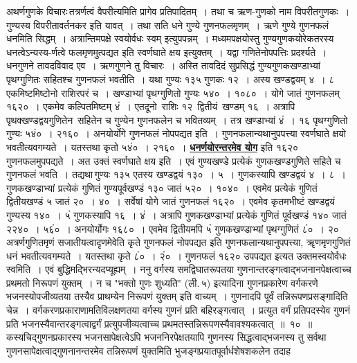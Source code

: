 \documentclass[11pt, openany]{book}
\begin{document}
\vspace{-4mm}
 अथर्णगुणके विचारः\textendash \,तत्रर्णत्वं वैपरीत्यमिति प्रागेव प्रतिपादितम्~।
तथा च ऋण-गुणको नाम विपरीतगुणकः~। गुण्यस्य विपरीतावर्तनकर इति
यावत्~। तथा सति धने गुण्ये गुणनफलमृणम्~। ऋणे गुण्ये गुणनफलं
धनमिति सिद्धम्~। अत्रान्तिमपक्षे स्वयोर्वधः स्वम् इत्युपपन्नम्~।
मध्यमपक्षयोस्तु गुण्यगुणकयोरेकतरस्य धनत्वेऽन्यस्य-र्णत्वे फलमृणमुत्पद्यत इति स्वर्णघाते
क्षय इत्युक्तम्~। यद्वा गणितेनोपपत्तिः प्रदर्श्यते~। धनगुणने तावदविवाद एव~।
ऋणगुणने तु विचारः~। अस्ति तावदिदं सुप्रसिद्धं गुण्यगुणकखण्डाभ्यां
पृथग्गुणितः सहितश्च गुणनफलं भवतीति~। यथा गुण्यः १३५ गुणकः १२~।
अस्य खण्डद्वयम् ४~। ८ एकमिष्टमिष्टोनो राशिरपरं च~। खण्डाभ्यां
पृथग्गुणितो गुण्यः ५४०~। १०८०~। योगे जातं गुणनफलम् १६२०~।
एकमेव कल्पितमिष्टम् ४ं~। एतदूनो \,राशिः १२ \,द्वितीयं \,खण्डम् १६~।
अत्रापि \,पृथक्खण्डद्वयगुणितेन \,सहितेन च गुण्येन गुणनफलेन च भवितव्यम्~।
तत्र खण्डाभ्यां ४ं~। १६ पृथग्गुणितो गुण्यः ५४ं०~। २१६०~।
अनयोर्योगे गुणनफलं नोपपद्यत इति~। गुणनफलान्यथानुपपत्त्या स्वर्णघाते
क्षयो भवतीत्यवगम्यते~। यतस्तथा कृतो ५४ं०~। २१६०~। \hyperref[3]{\textbf{धनर्णयोरन्तरमेव योग}} इति १६२० गुणनफलमुपपद्यते~। अत उक्तं स्वर्णघाते क्षय इति~।
\newpage
\noindent एवं गुण्यखण्डे प्रत्येकं गुणकखण्डगुणिते सहिते च गुणनफलं भवति~।
तद्यथा\textendash \,गुण्यः १३५ एतस्य खण्डद्वयं १३०~। ५~। गुणकस्यापि खण्डद्वयं
४~। ८~। गुणकखण्डाभ्यां प्रत्येकं गुणितं गुण्यपूर्वखण्डं १३० जातं ५२०~।
१०४०~। एवमेव प्रत्येकं गुणितं द्वितीयखण्डं ५ जातं २०~। ४०~। सर्वेषां
योगे जातं गुणनफलं १६२०~। एवमेव कृतमभीष्टं खण्डद्वयं गुण्यस्य १४०~। ५ं गुणकस्यापि
१६~। ४ं~। अत्रापि गुणकखण्डाभ्यां प्रत्येकं गुणितं पूर्वखण्डं १४० जातं
२२४०~। ५६ं०~। अनयोर्योगः १६८०~। एवमेव द्वितीयमपि ५ं गुणकखण्डाभ्यां
पृथग्गुणितं ८ं०~। २० अत्रर्णगुणितमृणं सजातीयत्वादृणमेवेति कृते गुणनफलं
नोपपद्यत इति गुणनफलान्यथानुपपत्त्या, ॠणमृणगुणितं धनं भवतीत्यवगम्यते~।
यतस्तथा कृते ८ं०~। २ं०~। गुणनफलं १६२० उपपद्यत इत्यत
उक्तमस्वयोर्वधः स्वमिति~। एवं बुद्धिमद्भिरन्यदप्यूह्यम्~। ननु वर्गस्य
समद्विघातरूपतया गुणनान्तरङ्गत्वाद्भजनानपेक्षत्वाच्च प्रथमतो निरूपणं युक्तम्~।
न च {\qt "भक्तो गुणः शुध्यति" (ली.\,५)} इत्यादिना गुणनप्रकारेण वर्गकरणे
भजनस्योपजीव्यतया तस्यैव प्राथम्येन निरूपणं युक्तम् इति वाच्यम्~।
गुणनादपि पूर्वं तन्निरूपणप्रसङ्गादिति चेन्न~। वर्गकरणप्रकाराणामतिविलक्षणतया
वर्गस्य गुणनं प्रति बहिरङ्गत्वात्~। प्रत्युत वर्गं प्रतिपदस्येव गुणनं
प्रति भजनस्यैवान्तरङ्गत्वाद्वर्गं प्रत्युपजीव्यत्वाच्च
प्रथमतस्तन्निरूपणस्यैवावश्यकत्वात्~॥~१०~॥\\

\vspace{-4mm}
कस्यचिद्गुणनप्रकारस्य भजनसापेक्षत्वेऽपि भजननिरपेक्षतयापि गुणनस्य
सिद्धत्वाद्भजनस्य तु सर्वथा गुणनसापेक्षत्वाद्गुणनानन्तरमेव तन्निरूपणं
युक्तमिति भुजङ्गप्रयातपूर्वार्धशेषशकलेन तदाह\textendash \,
\end{document}

